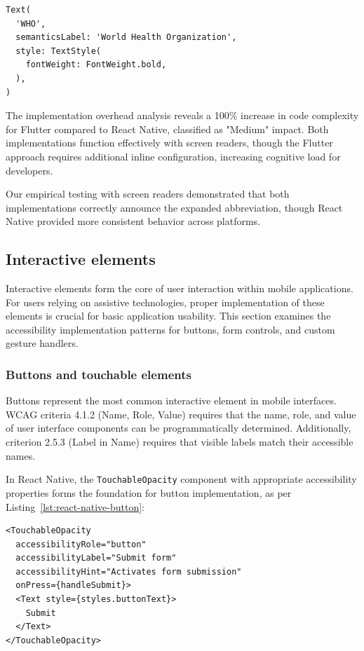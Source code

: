 \begin{lstlisting}[style=DartStyle, caption=Abbreviation handling in Flutter, label=lst:flutter-abbreviation]
Text(
  'WHO',
  semanticsLabel: 'World Health Organization',
  style: TextStyle(
    fontWeight: FontWeight.bold,
  ),
)
\end{lstlisting}

The implementation overhead analysis reveals a 100\% increase in code complexity for Flutter compared to React Native, classified as "Medium" impact. Both implementations function effectively with screen readers, though the Flutter approach requires additional inline configuration, increasing cognitive load for developers.

Our empirical testing with screen readers demonstrated that both implementations correctly announce the expanded abbreviation, though React Native provided more consistent behavior across platforms.

\subsection{Interactive elements}
\label{subsec:interactive-elements}

Interactive elements form the core of user interaction within mobile applications. For users relying on assistive technologies, proper implementation of these elements is crucial for basic application usability. This section examines the accessibility implementation patterns for buttons, form controls, and custom gesture handlers.

\subsubsection{Buttons and touchable elements}
\label{subsubsec:buttons-implementation}

Buttons represent the most common interactive element in mobile interfaces. WCAG criteria 4.1.2 (Name, Role, Value) requires that the name, role, and value of user interface components can be programmatically determined. Additionally, criterion 2.5.3 (Label in Name) requires that visible labels match their accessible names.

In React Native, the \texttt{TouchableOpacity} component with appropriate accessibility properties forms the foundation for button implementation, as per Listing~\ref{lst:react-native-button}:

\begin{lstlisting}[style=ReactNativeStyle, caption=Accessible button in React Native, label=lst:react-native-button]
<TouchableOpacity
  accessibilityRole="button"
  accessibilityLabel="Submit form"
  accessibilityHint="Activates form submission"
  onPress={handleSubmit}>
  <Text style={styles.buttonText}>
    Submit
  </Text>
</TouchableOpacity>
\end{lstlisting}

